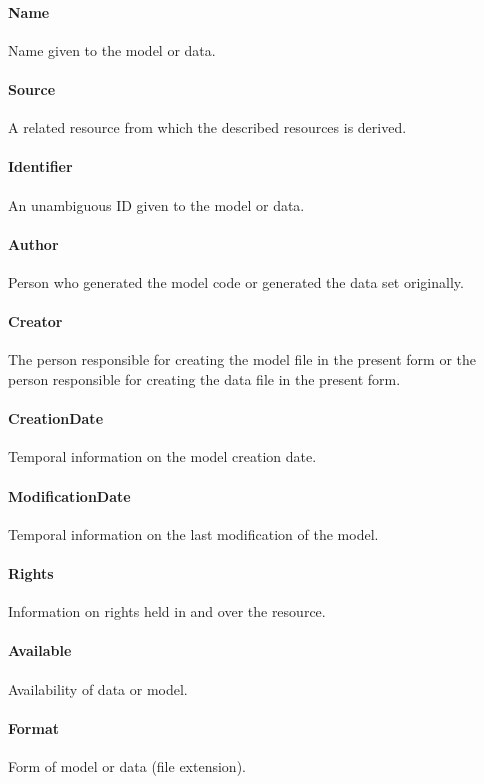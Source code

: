 \documentclass[a4paper]{report}
\begin{document}
\paragraph{Name}
Name given to the model or data.

\paragraph{Source}
A related resource from which the described resources is derived.

\paragraph{Identifier}
An unambiguous ID given to the model or data.

\paragraph{Author}
Person who generated the model code or generated the data set originally.

\paragraph{Creator}
The person responsible for creating the model file in the present form or the person responsible for creating the data file in the present form.

\paragraph{CreationDate}
Temporal information on the model creation date.

\paragraph{ModificationDate}
Temporal information on the last modification of the model.

\paragraph{Rights}
Information on rights held in and over the resource.

\paragraph{Available}
Availability of data or model.

\paragraph{Format}
Form of model or data (file extension).
\end{document}
